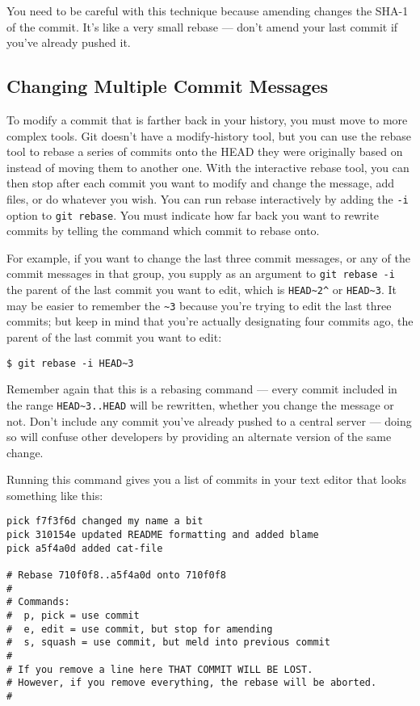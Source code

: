 \documentclass[a4paper]{book}
\begin{document}
You need to be careful with this technique because amending changes the SHA-1 of the commit. It's like a very small rebase --- don't amend your last commit if you've already pushed it.

\subsection{Changing Multiple Commit Messages}

To modify a commit that is farther back in your history, you must move to more complex tools. Git doesn't have a modify-history tool, but you can use the rebase tool to rebase a series of commits onto the HEAD they were originally based on instead of moving them to another one. With the interactive rebase tool, you can then stop after each commit you want to modify and change the message, add files, or do whatever you wish. You can run rebase interactively by adding the \texttt{-i} option to \texttt{git rebase}. You must indicate how far back you want to rewrite commits by telling the command which commit to rebase onto.

For example, if you want to change the last three commit messages, or any of the commit messages in that group, you supply as an argument to \texttt{git rebase -i} the parent of the last commit you want to edit, which is \texttt{HEAD\textasciitilde{}2\^{}} or \texttt{HEAD\textasciitilde{}3}. It may be easier to remember the \texttt{\textasciitilde{}3} because you're trying to edit the last three commits; but keep in mind that you're actually designating four commits ago, the parent of the last commit you want to edit:

\begin{shaded}\begin{verbatim}
$ git rebase -i HEAD~3
\end{verbatim}\end{shaded}

Remember again that this is a rebasing command --- every commit included in the range \texttt{HEAD\textasciitilde{}3..HEAD} will be rewritten, whether you change the message or not. Don't include any commit you've already pushed to a central server --- doing so will confuse other developers by providing an alternate version of the same change.

Running this command gives you a list of commits in your text editor that looks something like this:

\begin{shaded}\begin{verbatim}
pick f7f3f6d changed my name a bit
pick 310154e updated README formatting and added blame
pick a5f4a0d added cat-file

# Rebase 710f0f8..a5f4a0d onto 710f0f8
#
# Commands:
#  p, pick = use commit
#  e, edit = use commit, but stop for amending
#  s, squash = use commit, but meld into previous commit
#
# If you remove a line here THAT COMMIT WILL BE LOST.
# However, if you remove everything, the rebase will be aborted.
#
\end{verbatim}\end{shaded}
\end{document}

